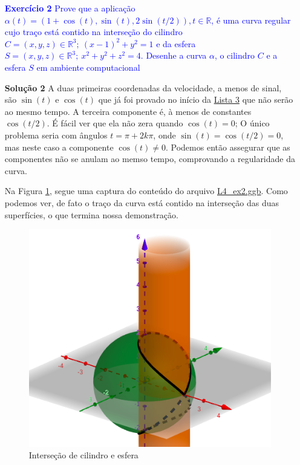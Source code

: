 \documentclass[12pt,letterpaper]{article}
\newcommand{\real}{\mathbb{R}}
\newcommand{\ex}[1]{\textcolor{blue}{\textbf{Exercício #1}}}
\newcommand{\sol}[1]{\textbf{Solução #1}}
\begin{document}
\begin{enumerate}
	\item[\ex{2}] \textcolor{blue}{Prove que a aplicação $\alpha(t) = (1 +\cos(t),\sin(t),2\sin(t/2)),t\in\real$, é uma curva regular cujo traço está contido na interseção do cilindro $C= (x,y,z)\in\real^3; ~(x-1)^2+y^2= 1$ e da esfera $S= (x,y,z)\in\real^3;~x^2+y^2+z^2= 4$. Desenhe a curva $\alpha$, o cilindro $C$ e a esfera $S$ em ambiente computacional}
	
	\item[\sol{2}] A duas primeiras coordenadas da velocidade, a menos de sinal, são $\sin (t)$ e $\cos(t)$ que já foi provado no início da \href{https://github.com/reneroliveira/Curves_and_Surfaces/blob/main/lists/list3.pdf}{Lista 3} que não serão ao mesmo tempo. A terceira componente é, à menos de constantes $\cos(t/2)$. É fácil ver que ela não zera quando $\cos(t)=0$; O único problema seria com ângulos $t=\pi+2k\pi$, onde $\sin(t)=\cos(t/2)=0$, mas neste caso a componente $\cos(t)\neq0$. Podemos então assegurar que as componentes não se anulam ao memso tempo, comprovando a regularidade da curva.
	
	Na Figura \ref{ex2}, segue uma captura do conteúdo do arquivo \href{https://github.com/reneroliveira/Curves_and_Surfaces/blob/main/ggb_files/L4_ex2.ggb}{L4\_ex2.ggb}. Como podemos ver, de fato o traço da curva está contido na interseção das duas superfícies, o que termina nossa demonstração.
	\begin{figure}[!htb]
		\centering
		\includegraphics[scale=0.7]{../images/L4_ex2.png}
		\caption{Interseção de cilindro e esfera}
		\label{ex2}
	\end{figure}


\end{enumerate}
\end{document}
